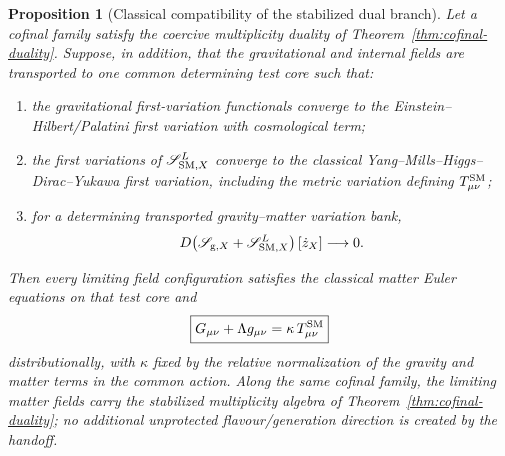 \documentclass[11pt]{article}
\newtheorem{proposition}[theorem]{Proposition}
\theoremstyle{definition}
\theoremstyle{remark}
\begin{document}
\begin{proposition}[Classical compatibility of the stabilized dual branch]
\label{prop:classical-compatibility}
Let a cofinal family satisfy the coercive multiplicity duality of
Theorem~\ref{thm:cofinal-duality}.  Suppose, in addition, that the gravitational
and internal fields are transported to one common determining test core such
that:
\begin{enumerate}[label=\textup{(C\arabic*)},leftmargin=3em]
\item the gravitational first-variation functionals converge to the
      Einstein--Hilbert/Palatini first variation with cosmological term;
\item the first variations of $\mathscr S_{{\rm SM},X}^{L}$ converge to the
      classical Yang--Mills--Higgs--Dirac--Yukawa first variation, including
      the metric variation defining $T_{\mu\nu}^{\rm SM}$;
\item for a determining transported gravity--matter variation bank,
      \[
      D\!\left(\mathscr S_{{\rm g},X}
      +\mathscr S_{{\rm SM},X}^{L}\right)[\dot z_X]\longrightarrow0.
      \]
\end{enumerate}
Then every limiting field configuration satisfies the classical matter Euler
equations on that test core and
\begin{equation}
\boxed{
G_{\mu\nu}+\Lambda g_{\mu\nu}
=\kappa\,T_{\mu\nu}^{\rm SM}}
\label{eq:einstein-matter}
\end{equation}
distributionally, with $\kappa$ fixed by the relative normalization of the
gravity and matter terms in the common action.  Along the same cofinal family,
the limiting matter fields carry the stabilized multiplicity algebra of
Theorem~\ref{thm:cofinal-duality}; no additional unprotected
flavour/generation direction is created by the handoff.
\end{proposition}
\end{document}
